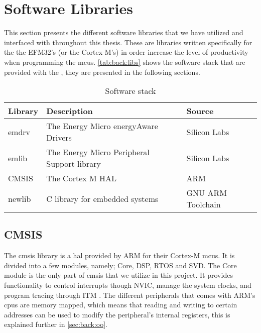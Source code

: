 
\section{Software Libraries}
\label{sec:back:lib}

This section presents the different software libraries that we have utilized and interfaced with throughout this thesis.
These are libraries written specifically for the the EFM32's (or the Cortex-M's) in order increase the level of productivity when programming the \glspl{mcu}.
\autoref{tab:back:libs} shows the software stack that are provided with the \gecko, they are presented in the following sections.

\begin{table}[H]
  \begin{tabular}{l|l|l}
    \textbf{Library} & \textbf{Description} & \textbf{Source} \\
    \hline
    emdrv & The Energy Micro energyAware Drivers & Silicon Labs \\
    emlib & The Energy Micro Peripheral Support library & Silicon Labs \\
    CMSIS & The Cortex M HAL & ARM \\
    newlib & C library for embedded systems & GNU ARM Toolchain \\
    \hline
  \end{tabular}
  \caption{Software stack}
  \label{tab:back:libs}
\end{table}

\subsection{CMSIS}

The \gls{cmsis} library is a \gls{hal} provided by ARM for their Cortex-M \glspl{mcu}.
It is divided into a few modules, namely; Core, DSP, RTOS and SVD.
The Core module is the only part of \gls{cmsis} that we utilize in this project.
It provides functionality to control interrupts though NVIC, manage the system clocks, and program tracing through ITM .
The different peripherals that comes with ARM's \glspl{cpu} are memory mapped, which means that reading and writing to certain addresses can be used to modify the peripheral's internal registers, this is explained further in \autoref{sec:back:oo}.

